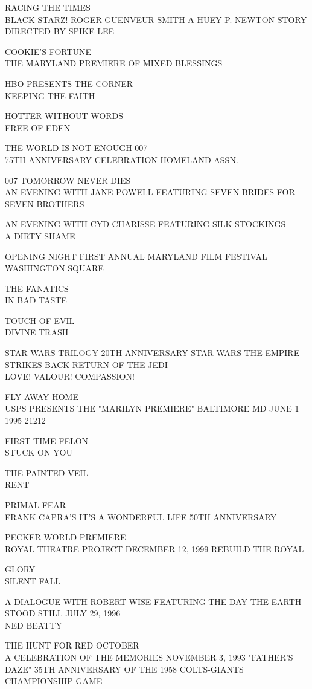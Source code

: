 \documentclass[10pt,letterpaper]{article}
\begin{document}
RACING THE TIMES\\
BLACK STARZ!  ROGER GUENVEUR SMITH A HUEY P. NEWTON STORY DIRECTED BY SPIKE LEE

COOKIE'S FORTUNE\\
THE MARYLAND PREMIERE OF MIXED BLESSINGS

HBO PRESENTS THE CORNER\\
KEEPING THE FAITH

HOTTER WITHOUT WORDS\\
FREE OF EDEN

THE WORLD IS NOT ENOUGH 007\\
75TH ANNIVERSARY CELEBRATION HOMELAND ASSN.

007 TOMORROW NEVER DIES\\
AN EVENING WITH JANE POWELL FEATURING SEVEN BRIDES FOR SEVEN BROTHERS

AN EVENING WITH CYD CHARISSE FEATURING SILK STOCKINGS\\
A DIRTY SHAME

OPENING NIGHT FIRST ANNUAL MARYLAND FILM FESTIVAL\\
WASHINGTON SQUARE

THE FANATICS\\
IN BAD TASTE

TOUCH OF EVIL\\
DIVINE TRASH

STAR WARS TRILOGY 20TH ANNIVERSARY STAR WARS THE EMPIRE STRIKES BACK RETURN OF THE JEDI\\
LOVE!  VALOUR!  COMPASSION!

FLY AWAY HOME\\
USPS PRESENTS THE "MARILYN PREMIERE" BALTIMORE MD JUNE 1 1995 21212

FIRST TIME FELON\\
STUCK ON YOU

THE PAINTED VEIL\\
RENT

PRIMAL FEAR\\
FRANK CAPRA'S IT'S A WONDERFUL LIFE 50TH ANNIVERSARY

PECKER WORLD PREMIERE\\
ROYAL THEATRE PROJECT DECEMBER 12, 1999 REBUILD THE ROYAL

GLORY\\
SILENT FALL

A DIALOGUE WITH ROBERT WISE FEATURING THE DAY THE EARTH STOOD STILL JULY 29, 1996\\
NED BEATTY

THE HUNT FOR RED OCTOBER\\
A CELEBRATION OF THE MEMORIES NOVEMBER 3, 1993 "FATHER'S DAZE" 35TH ANNIVERSARY OF THE 1958 COLTS{-}GIANTS CHAMPIONSHIP GAME
\end{document}

